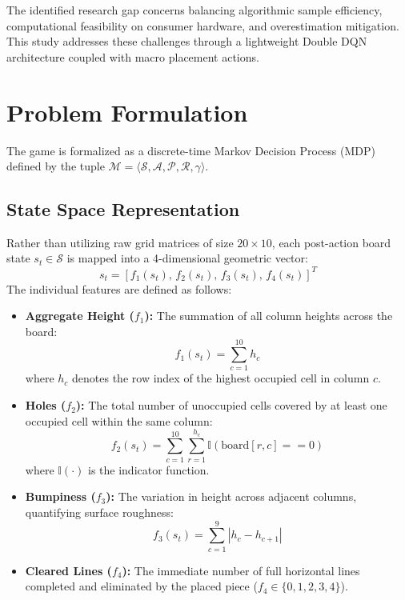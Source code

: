 \documentclass[runningheads]{llncs}
\begin{document}
The identified research gap concerns balancing algorithmic sample efficiency, computational feasibility on consumer hardware, and overestimation mitigation. This study addresses these challenges through a lightweight Double DQN architecture coupled with macro placement actions.

\section{Problem Formulation}
The game is formalized as a discrete-time Markov Decision Process (MDP) defined by the tuple $\mathcal{M} = \langle \mathcal{S}, \mathcal{A}, \mathcal{P}, \mathcal{R}, \gamma \rangle$.

\subsection{State Space Representation}
Rather than utilizing raw grid matrices of size $20 \times 10$, each post-action board state $s_t \in \mathcal{S}$ is mapped into a 4-dimensional geometric vector:
\begin{equation}
s_t = \left[ f_1(s_t),\, f_2(s_t),\, f_3(s_t),\, f_4(s_t) \right]^T
\end{equation}
The individual features are defined as follows:
\begin{itemize}
    \item \textbf{Aggregate Height ($f_1$):} The summation of all column heights across the board:
    \begin{equation}
    f_1(s_t) = \sum_{c=1}^{10} h_c
    \end{equation}
    where $h_c$ denotes the row index of the highest occupied cell in column $c$.
    \item \textbf{Holes ($f_2$):} The total number of unoccupied cells covered by at least one occupied cell within the same column:
    \begin{equation}
    f_2(s_t) = \sum_{c=1}^{10} \sum_{r=1}^{h_c} \mathbb{I}(\text{board}[r, c] == 0)
    \end{equation}
    where $\mathbb{I}(\cdot)$ is the indicator function.
    \item \textbf{Bumpiness ($f_3$):} The variation in height across adjacent columns, quantifying surface roughness:
    \begin{equation}
    f_3(s_t) = \sum_{c=1}^{9} |h_c - h_{c+1}|
    \end{equation}
    \item \textbf{Cleared Lines ($f_4$):} The immediate number of full horizontal lines completed and eliminated by the placed piece ($f_4 \in \{0, 1, 2, 3, 4\}$).
\end{itemize}
\end{document}
